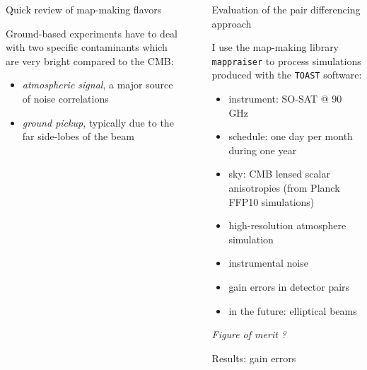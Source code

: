 \documentclass[final]{beamer}
\newlength{\sepwidth}
\newlength{\colwidth}
\newcommand{\separatorcolumn}{\begin{column}{\sepwidth}\end{column}}
\begin{document}
\begin{frame}[t]
\begin{columns}[t]
\begin{column}{\colwidth}
\begin{alertblock}{Quick review of map-making flavors}

        Ground-based experiments have to deal with two specific contaminants which are very bright compared to the CMB:

        \begin{itemize}
          \item \emph{atmospheric signal}, a major source of noise correlations
          \item \emph{ground pickup}, typically due to the far side-lobes of the beam
        \end{itemize}


      \end{alertblock}

    \end{column}

    \separatorcolumn

    \begin{column}{\colwidth}

      \begin{block}{Evaluation of the pair differencing approach}

        I use the map-making library \texttt{mappraiser}\cite{ElBouhargani:2021umq} to process simulations produced with the \texttt{TOAST} software:
        \begin{itemize}
          \item instrument: SO-SAT @ 90 GHz
          \item schedule: one day per month during one year
          \item sky: CMB lensed scalar anisotropies (from Planck FFP10 simulations)
          \item high-resolution atmosphere simulation
          \item instrumental noise
          \item gain errors in detector pairs
          \item in the future: elliptical beams
        \end{itemize}

        \emph{Figure of merit ?}

      \end{block}

      \begin{block}{Results: gain errors}


\end{block}
\end{column}
\end{columns}
\end{frame}
\end{document}
